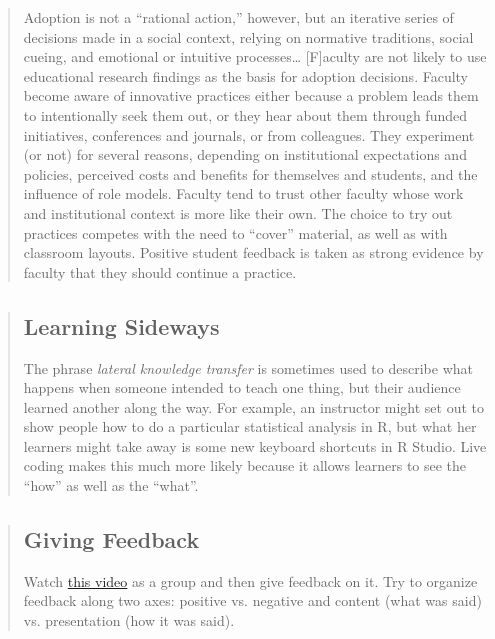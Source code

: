 \begin{quote}   %
Adoption is not a ``rational action,'' however, but an iterative
series of decisions made in a social context, relying on normative
traditions, social cueing, and emotional or intuitive processes\ldots{}
[F]aculty are not likely to use educational research findings as the
basis for adoption decisions. Faculty become aware of innovative
practices either because a problem leads them to intentionally seek
them out, or they hear about them through funded initiatives,
conferences and journals, or from colleagues. They experiment (or
not) for several reasons, depending on institutional expectations
and policies, perceived costs and benefits for themselves and
students, and the influence of role models. Faculty tend to trust
other faculty whose work and institutional context is more like
their own. The choice to try out practices competes with the need to
``cover'' material, as well as with classroom layouts. Positive
student feedback is taken as strong evidence by faculty that they
should continue a practice.
\end{quote}   %

\begin{quotation}   %
\subsection*{Learning Sideways}

The phrase \emph{lateral knowledge transfer} is sometimes used to describe what happens
when someone intended to teach one thing,
but their audience learned another along the way.
For example,
an instructor might set out to show people how to do a particular statistical analysis in R,
but what her learners might take away is some new keyboard shortcuts in R Studio.
Live coding makes this much more likely
because it allows learners to see the ``how'' as well as the ``what''.
\end{quotation}   %

\begin{quotation}   %
\subsection*{Giving Feedback}

Watch \href{https://www.youtube.com/watch?v=-ApVt04rB4U}{this video} as a group
and then give feedback on it.
Try to organize feedback along two axes:
positive vs. negative
and content (what was said) vs. presentation (how it was said).
\end{quotation}   %

